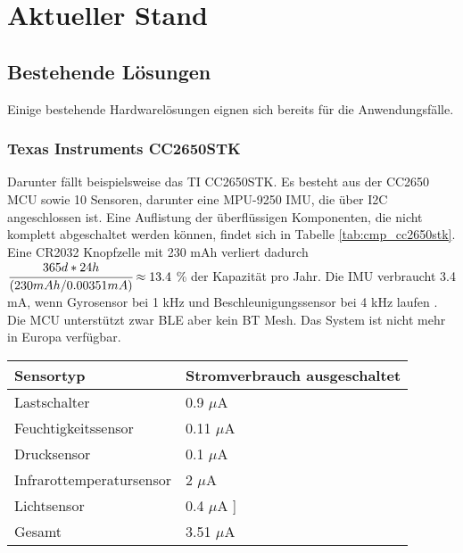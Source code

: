 

\chapter{Aktueller Stand}

\section{Bestehende Lösungen}
Einige bestehende Hardwarelösungen eignen sich bereits für die Anwendungsfälle.

\subsection{Texas Instruments CC2650STK}
Darunter fällt beispielsweise das TI CC2650STK.
Es besteht aus der CC2650 MCU sowie 10 Sensoren, darunter eine MPU-9250 IMU, die über I2C angeschlossen ist.
Eine Auflistung der überflüssigen Komponenten, die nicht komplett abgeschaltet werden können, findet sich in Tabelle \ref{tab:cmp_cc2650stk}.
Eine CR2032 Knopfzelle mit 230 mAh verliert dadurch $\cfrac{365d*24h}{(230mAh/0.00351mA)} \approx 13.4$ \% der Kapazität pro Jahr.
Die IMU verbraucht 3.4 mA, wenn Gyrosensor bei 1 kHz und Beschleunigungssensor bei 4 kHz laufen \cite{datasheet_mpu9250}.
Die MCU unterstützt zwar BLE aber kein BT Mesh.
Das System ist nicht mehr in Europa verfügbar. \cite{site_cc2650stk}

\begin{minipage}{\linewidth}
	\label{tab:cmp_cc2650stk}
	\begin{tabularx}{\linewidth}{X|X}
    Sensortyp & Stromverbrauch ausgeschaltet\\
    \hline
    Lastschalter & 0.9 $\mu$A \cite{datasheet_tps2291}\\
    Feuchtigkeitssensor & 0.11 $\mu$A \cite{datasheet_hdc1000}\\
    Drucksensor & 0.1 $\mu$A \cite{datasheet_bmp280}\\
    Infrarottemperatursensor & 2 $\mu$A \cite{site_tmp007}\\
    Lichtsensor & 0.4 $\mu$A \cite{datasheet_opt3001}]\\
    \hline
    Gesamt & 3.51 $\mu$A\\
  \end{tabularx}
\end{minipage}

